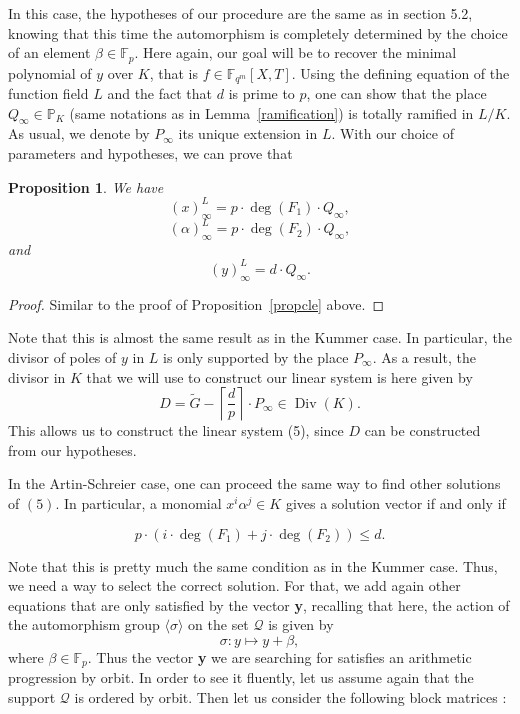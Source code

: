 \documentclass[10pt]{article}
\newtheorem{prop1}[thm]{Proposition}
\theoremstyle{definition}
\theoremstyle{definition}
\theoremstyle{definition}
\newcommand{\s}{\vspace{0.3cm}}
\newcommand{\cd}{\cdot}
\newcommand{\PP}{\mathbb{P}}
\newcommand{\fqm}{\mathbb{F}_{q^m}}
\newcommand{\QR}{\mathcal{Q}}
\newcommand{\Div}{\operatorname{Div}}
\begin{document}
\s

In this case, the hypotheses of our procedure are the same as in section 5.2, knowing that this time the automorphism is completely determined by the choice of an element $\beta \in \mathbb{F}_p$. Here again, our goal will be to recover the minimal polynomial of $y$ over $K$, that is $f \in \fqm[X,T]$. Using the defining equation of the function field $L$ and the fact that $d$ is prime to $p$, one can show that the place $Q_{\infty} \in \PP_K$ (same notations as in Lemma~\ref{ramification}) is totally ramified in $L/K$. As usual, we denote by $P_{\infty}$ its unique extension in $L$. With our choice of parameters and hypotheses, we can prove that

\s

\begin{prop1} \label{propcle2}
We have
\[(x)^L_{\infty} = p \cd \deg(F_1) \cd Q_{\infty},\]
\[(\alpha)^L_{\infty} = p \cd \deg(F_2) \cd Q_{\infty},\]
and
\[(y)^L_{\infty} = d \cd Q_{\infty}.\]
\end{prop1}

\s

\begin{proof}
Similar to the proof of Proposition~\ref{propcle} above.
\end{proof}

\s

Note that this is almost the same result as in the Kummer case. In particular, the divisor of poles of $y$ in $L$ is only supported by the place $P_{\infty}$. As a result, the divisor in $K$ that we will use to construct our linear system is here given by 
\[D = \tilde{G} - \left\lceil\frac{d}{p}\right\rceil \cd P_{\infty} \in \Div(K).\]
This allows us to construct the linear system (5), since $D$ can be constructed from our hypotheses. 

\s

In the Artin-Schreier case, one can proceed the same way to find other solutions of $(5)$. In particular, a monomial $x^i\alpha^j \in K$ gives a solution vector if and only if 

\[p \cd (i \cd \deg(F_1)+j \cd \deg(F_2)) \leq d.\]

Note that this is pretty much the same condition as in the Kummer case. Thus, we need a way to select the correct solution. For that, we add again other equations that are only satisfied by the vector \textbf{y}, recalling that here, the action of the automorphism group $\langle\sigma\rangle$ on the set $\QR$ is given by 
\[\sigma : y \longmapsto y + \beta,\]
where $\beta \in \mathbb{F}_p$. Thus the vector \textbf{y} we are searching for satisfies an arithmetic progression by orbit. In order to see it fluently, let us assume again that the support $\QR$ is ordered by orbit. Then let us consider the following block matrices :
\end{document}
